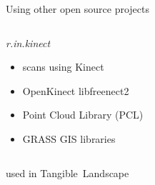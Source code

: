 \documentclass[xcolor={dvipsnames,usenames},beamer,aspectratio=169]{beamer}
\newcommand{\module}[1]{\emph{#1}}
\begin{document}
\begin{frame}{Using other open source projects}

\begin{columns}
\begin{column}{0.5\textwidth}

\begin{block}{\module{r.in.kinect}}
 \begin{itemize}
  \item scans using Kinect
  \item OpenKinect libfreenect2
  \item Point Cloud Library (PCL)
  \item GRASS GIS libraries
 \end{itemize}
\end{block}

\begin{columns}
\begin{column}{0.6\textwidth}
\small

used in Tangible~Landscape

\end{column}
\begin{column}{0.2\textwidth}


\end{column}
\end{columns}

\end{column}
\begin{column}{0.45\textwidth}

\begin{center}
\end{center}

\end{column}
\end{columns}

\end{frame}
\end{document}
